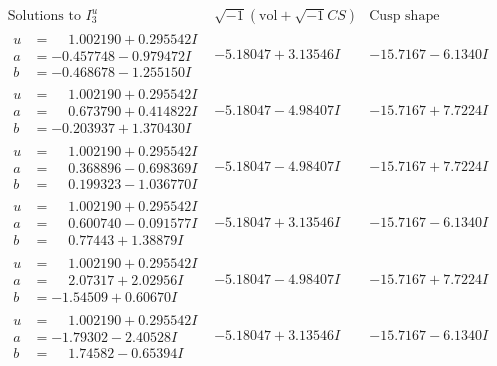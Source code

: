 \documentclass[1p]{elsarticle_modified}
\theoremstyle{definition}
\newcommand{\I}{\sqrt{-1}}
\begin{document}
$$\begin{array}{c|c|c}  
\text{Solutions to }I^u_{3}& \I (\text{vol} + \sqrt{-1}CS) & \text{Cusp shape}\\
 \hline 
\begin{aligned}
u &= \phantom{-}1.002190 + 0.295542 I \\
a &= -0.457748 - 0.979472 I \\
b &= -0.468678 - 1.255150 I\end{aligned}
 & -5.18047 + 3.13546 I & -15.7167 - 6.1340 I \\ \hline\begin{aligned}
u &= \phantom{-}1.002190 + 0.295542 I \\
a &= \phantom{-}0.673790 + 0.414822 I \\
b &= -0.203937 + 1.370430 I\end{aligned}
 & -5.18047 - 4.98407 I & -15.7167 + 7.7224 I \\ \hline\begin{aligned}
u &= \phantom{-}1.002190 + 0.295542 I \\
a &= \phantom{-}0.368896 - 0.698369 I \\
b &= \phantom{-}0.199323 - 1.036770 I\end{aligned}
 & -5.18047 - 4.98407 I & -15.7167 + 7.7224 I \\ \hline\begin{aligned}
u &= \phantom{-}1.002190 + 0.295542 I \\
a &= \phantom{-}0.600740 - 0.091577 I \\
b &= \phantom{-}0.77443 + 1.38879 I\end{aligned}
 & -5.18047 + 3.13546 I & -15.7167 - 6.1340 I \\ \hline\begin{aligned}
u &= \phantom{-}1.002190 + 0.295542 I \\
a &= \phantom{-}2.07317 + 2.02956 I \\
b &= -1.54509 + 0.60670 I\end{aligned}
 & -5.18047 - 4.98407 I & -15.7167 + 7.7224 I \\ \hline\begin{aligned}
u &= \phantom{-}1.002190 + 0.295542 I \\
a &= -1.79302 - 2.40528 I \\
b &= \phantom{-}1.74582 - 0.65394 I\end{aligned}
 & -5.18047 + 3.13546 I & -15.7167 - 6.1340 I \\ \hline\begin{aligned}

\end{aligned}
\end{array}$$
\end{document}
